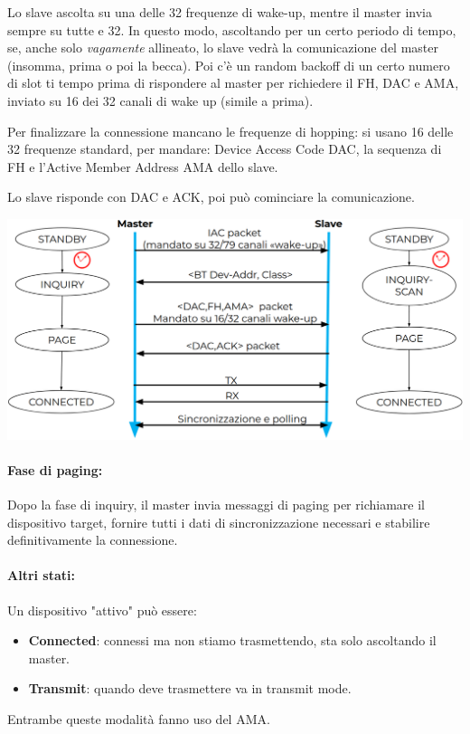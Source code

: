 Lo slave ascolta su una delle 32 frequenze di wake-up, mentre il master invia sempre su tutte e 32. In questo modo, ascoltando per un certo periodo di tempo, se, anche solo \textit{vagamente} allineato, lo slave vedrà la comunicazione del master (insomma, prima o poi la becca). Poi c'è un random backoff di un certo numero di slot ti tempo prima di rispondere al master per richiedere il FH, DAC e AMA, inviato su 16 dei 32 canali di wake up (simile a prima).

Per finalizzare la connessione mancano le frequenze di hopping: si usano 16 delle 32 frequenze standard, per mandare: Device Access Code DAC, la sequenza di FH e l'Active Member Address AMA dello slave.

Lo slave risponde con DAC e ACK, poi può cominciare la comunicazione.
\begin{center}
	\includegraphics[width=0.95\linewidth]{img/wpan/inquiry1}
\end{center}


\paragraph{Fase di paging:} Dopo la fase di inquiry, il master invia messaggi di paging per richiamare il dispositivo target, fornire tutti i dati di sincronizzazione necessari e stabilire definitivamente la connessione.

\paragraph{Altri stati:} Un dispositivo "attivo" può essere:
\begin{itemize}
	\item \textbf{Connected}: connessi ma non stiamo trasmettendo, sta solo ascoltando il master.
	\item \textbf{Transmit}: quando deve trasmettere va in transmit mode.
\end{itemize}
Entrambe queste modalità fanno uso del AMA. 

